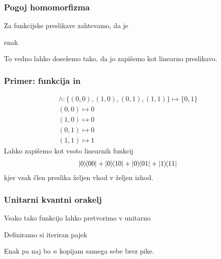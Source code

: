 \documentclass[10pt]{beamer}
\begin{document}
\begin{frame}
  \frametitle{Pogoj homomorfizma}
  Za funkcijske preslikave zahtevamo, da je
  \begin{center}
\end{center}
  enak
  \begin{center}
\end{center}
  To vedno lahko dosežemo tako, da jo zapišemo kot linearno preslikavo.
\end{frame}
\begin{frame}
  \frametitle{Primer: funkcija in}
  \begin{align*}
    \land: \{(0,0),(1,0),(0,1), (1,1)\}\mapsto \{0,1\}\\
    (0,0)\mapsto 0\\
    (1,0)\mapsto 0\\
    (0,1)\mapsto 0\\
    (1,1)\mapsto 1
  \end{align*}
  Lahko zapišemo kot vsoto linearnih funkcij
  \begin{align*}
    \ketbra{0}{00} + \ketbra{0}{10} + \ketbra{0}{01} + \ketbra{1}{11}
  \end{align*}
  kjer vsak člen preslika željen vhod v željen izhod.
\end{frame}
\begin{frame}
  \frametitle{Unitarni kvantni orakelj}
  Vsako tako funkcijo lahko pretvorimo v unitarno
  
  Definiramo si iteriran pajek
  \begin{center}
\end{center}
  Enak pa naj bo \(n\) kopijam samega sebe brez pike. 
\end{frame}
\end{document}
